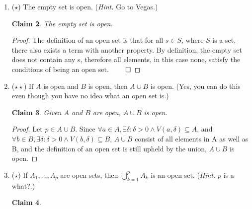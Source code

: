\documentclass[11pt]{letter}
\newtheorem{claim}{Claim}
\theoremstyle{definition}
\begin{document}
\begin{description}
\begin{enumerate}
\begin{enumerate}
\begin{proof}
Since $A\Delta B\subseteq (A\cup B)\setminus(A\cap B)$, and $(A\cup B)\setminus(A\cap B)\subseteq A\Delta B$, this means that $A\Delta B=(A\cup B)\setminus(A\cap B)$.
\end{proof}
					\item If $A\cup B\subseteq C\cup D$ and $A \cap B=\varnothing$, and $C\subseteq A$, then $B\subseteq D$.
\begin{claim}
Given $A\cup B\subseteq C\cup D$ and $A \cap B=\varnothing$, and $C\subseteq A$, then $B\subseteq D$.
\end{claim}
\begin{proof}
Let $r\in C$. Then $C\cup B\subseteq C\cup D$, as $r\in C\cup A$, and since $r\in C$. Furthermore, $C\cup B=\varnothing$, as C is a subset of $A$, and which $A\cup B=\varnothing$.   So since $C\cup B\subseteq C\cup D$, and since C and B share no terms, $B\subseteq D$.
\end{proof}
				\end{enumerate}
			\item ($\star$) The empty set is open. ({\em Hint.} Go to Vegas.)
\begin{claim}
The empty set is open.
\end{claim}
\begin{proof}
The definition of an open set is that for all $s \in S$, where $S$ is a set, there also exists a term with another property. By definition, the empty set does not contain any s, therefore all elements, in this case none, satisfy the conditions of being an open set. $\qed$
\end{proof}
			\item ($\star\star$) If $A$ is open and $B$ is open, then $A\cup B$ is open. (Yes, you can do this even though you have no idea what an open set is.)
\begin{claim}
Given $A$ and $B$ are open, $A\cup B$ is open.
\end{claim}
\begin{proof}
Let $p\in A\cup B$. Since $\forall a\in A, \exists \delta: \delta>0\wedge V(a, \delta)\subseteq A$, and $\forall b\in B,\exists \delta: \delta>0\wedge V(b, \delta)\subseteq B$,  $A\cup B$ consist of all elements in A as well as B, and the definition of an open set is still upheld by the union, $A\cup B$ is open.
\end{proof}
			\item ($\star$) If $A_1,\ldots, A_p$ are open sets, then $\displaystyle\bigcup_{k=1}^pA_k$ is an open set. ({\em Hint.} $p$ is a what?.)
\begin{claim}

\end{claim}
\end{enumerate}
\end{description}
\end{document}
